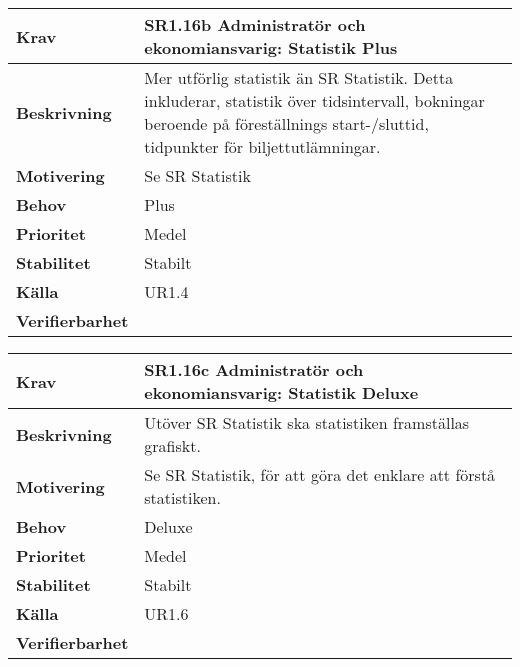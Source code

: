 \documentclass[a4paper, twoside, 11pt, titlepage]{article}
\begin{document}
	\begin{tabular} { p{2.6cm} p{12.5cm} }
		\hline
		\sffamily\textbf{Krav} & \sffamily\textbf{SR1.16b Administratör och ekonomiansvarig: Statistik Plus } \\
		\hline
		\sffamily\textbf{Beskrivning} & Mer utförlig statistik än SR Statistik. Detta inkluderar, statistik över tidsintervall, bokningar beroende på föreställnings start-/sluttid, tidpunkter för biljettutlämningar.  \\
		\hline
		\sffamily\textbf{Motivering} & Se SR Statistik  \\
		\hline
		\sffamily\textbf{Behov} & Plus  \\
		\hline
		\sffamily\textbf{Prioritet} & Medel  \\
		\hline
		\sffamily\textbf{Stabilitet} & Stabilt  \\
		\hline
		\sffamily\textbf{Källa} & UR1.4  \\
		\hline
		\sffamily\textbf{Verifierbarhet} &   \\
		\hline
	\end{tabular}
	\vspace{6mm}

	\begin{tabular} { p{2.6cm} p{12.5cm} }
		\hline
		\sffamily\textbf{Krav} & \sffamily\textbf{SR1.16c Administratör och ekonomiansvarig: Statistik Deluxe } \\
		\hline
		\sffamily\textbf{Beskrivning} & Utöver SR Statistik ska statistiken framställas grafiskt.  \\
		\hline
		\sffamily\textbf{Motivering} & Se SR Statistik, för att göra det enklare att förstå statistiken.  \\
		\hline
		\sffamily\textbf{Behov} & Deluxe  \\
		\hline
		\sffamily\textbf{Prioritet} & Medel  \\
		\hline
		\sffamily\textbf{Stabilitet} & Stabilt  \\
		\hline
		\sffamily\textbf{Källa} & UR1.6  \\
		\hline
		\sffamily\textbf{Verifierbarhet} &   \\
		\hline
	\end{tabular}
	\vspace{6mm}
\end{document}
